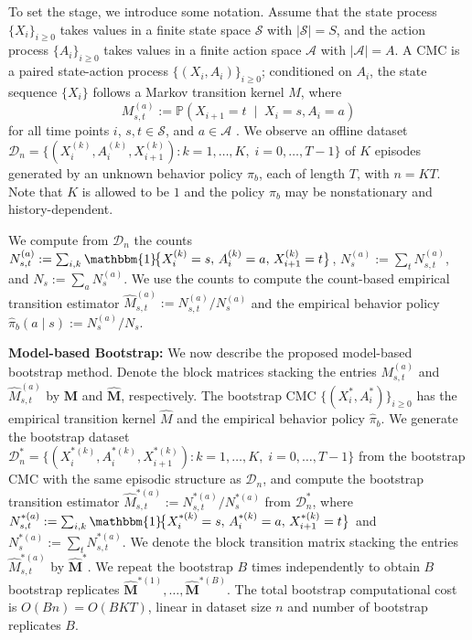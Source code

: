 \documentclass{article}
\numberwithin{equation}{section}
\newcommand{\lp}{\left(}
\newcommand{\rp}{\right)}
\newcommand{\indicator}{\mathbbm{1}}
\begin{document}
To set the stage, we introduce some notation. 
Assume that the state process $\{X_i\}_{i \geq 0}$ takes values in a finite state space $\mathcal S$ with $|\mathcal S| = S$, and the action process $\{A_i\}_{i \geq 0}$ takes values in a finite action space $\mathcal A$ with $|\mathcal A| = A$.
A CMC is a paired state-action process $\bigl\{\lp X_i, A_i\rp\bigr\}_{i\geq 0}$; conditioned on $A_i$, the state sequence $\{X_i\}$ follows a Markov transition kernel $M$, where  
\[M_{s,t}^{(a)} := \mathbb P\lp X_{i+1} = t \;\mid\; X_i = s, A_i = a \rp\] for all time points $i$, $s,t\in\mathcal{S}$, and $a\in\mathcal{A}$ \citep{borkar1991topics}. We observe an offline dataset $\mathcal{D}_n
= \bigl\{ (X^{(k)}_i, A^{(k)}_i, X^{(k)}_{i+1}): k = 1,\dots,K,\; i = 0,\dots,T-1 \bigr\}$ of $K$ episodes generated by an unknown behavior policy $\pi_b$, each of length $T$, with $n=KT$. 
Note that $K$ is allowed to be $1$ and the policy $\pi_b$ may be nonstationary and history-dependent. 

We compute from $\mathcal{D}_n$ the counts $N^{(a)}_{s,t} := \sum_{i,k}\indicator\!\bigl\{X^{(k)}_i=s,\, A^{(k)}_i=a,\, X^{(k)}_{i+1}=t\bigr\}$, $N^{(a)}_s := \sum_t N^{(a)}_{s,t}$, and $N_s := \sum_a N_s^{(a)}$.
We use the counts to compute the count-based empirical transition estimator $\hat M^{(a)}_{s,t} := N^{(a)}_{s,t} / N^{(a)}_s$ and the empirical behavior policy $\hat{\pi}_b(a \mid s) := N_s^{(a)}/N_s$.

\textbf{Model-based Bootstrap:} We now describe the proposed model-based bootstrap method.
Denote the block matrices stacking the entries $M^{(a)}_{s,t}$ and $\hat M^{(a)}_{s,t}$ by $\mathbf{M}$ and $\hat{\mathbf{M}}$, respectively.  
The bootstrap CMC $\{(X_i^\ast, A_i^\ast)\}_{i\ge0}$ has the empirical transition kernel $\hat M$ and the empirical behavior policy $\hat\pi_b$.
We generate the bootstrap dataset $\mathcal{D}_n^\ast = \bigl\{ (X^{\ast (k)}_i, A^{\ast (k)}_i, X^{\ast (k)}_{i+1}): k = 1,\dots,K,\; i = 0,\dots,T-1 \bigr\}$ from the bootstrap CMC with the same episodic structure as $\mathcal{D}_n$, and compute the bootstrap transition estimator $\hat M_{s,t}^{\ast(a)} := N_{s,t}^{\ast(a)} / N_s^{\ast(a)}$ from $\mathcal{D}_n^\ast$, where $N^{\ast (a)}_{s,t} := \sum_{i,k}\indicator\!\bigl\{X^{\ast (k)}_i=s,\, A^{\ast (k)}_i=a,\, X^{\ast (k)}_{i+1}=t\bigr\}$ and $N^{\ast (a)}_s := \sum_t N^{\ast (a)}_{s,t}$.
We denote the block transition matrix stacking the entries $\hat M_{s,t}^{\ast(a)}$ by $\hat{\mathbf{M}}^\ast$.
We repeat the bootstrap $B$ times independently to obtain $B$ bootstrap replicates $\hat{\mathbf{M}}^{\ast(1)},\dots,\hat{\mathbf{M}}^{\ast(B)}$.
The total bootstrap computational cost is $O(Bn) = O(BKT)$, linear in dataset size $n$ and number of bootstrap replicates $B$.
\end{document}

